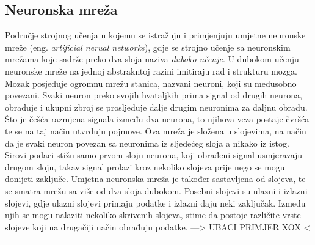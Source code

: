 \subsection{Neuronska mreža}
Područje strojnog učenja u kojemu se istražuju i primjenjuju umjetne neuronske mreže (eng. \textit{artificial nerual networks}), gdje se strojno učenje sa neuronskim mrežama koje sadrže preko dva sloja naziva \emph{duboko učenje}. U dubokom učenju neuronske mreže na jednoj abstrakntoj razini imitiraju rad i strukturu mozga. Mozak posjeduje ogromnu mrežu stanica, nazvani neuroni, koji su međusobno povezani. Svaki neuron preko svojih hvataljkih prima signal od drugih neurona, obrađuje i ukupni zbroj se prosljeđuje dalje drugim neuronima za daljnu obradu. Što je češća razmjena signala između dva neurona, to njihova veza postaje čvršća te se na taj način utvrđuju pojmove. Ova mreža je složena u slojevima, na način da je svaki neuron povezan sa neuronima iz sljedećeg sloja a nikako iz istog. Sirovi podaci stižu samo prvom sloju neurona, koji obrađeni signal usmjeravaju drugom sloju, takav signal prolazi kroz nekoliko slojeva prije nego se mogu donijeti zaključe. Umjetna neuronska mreža je također sastavljena od slojeva, te se smatra mrežu sa više od dva sloja dubokom. Posebni slojevi su ulazni i izlazni slojevi, gdje ulazni slojevi primaju podatke i izlazni daju neki zaključak. Između njih se mogu nalaziti nekoliko skrivenih slojeva, stime da postoje različite vrste slojeve koji na drugačiji način obrađuju podatke. 
---> UBACI PRIMJER XOX <---